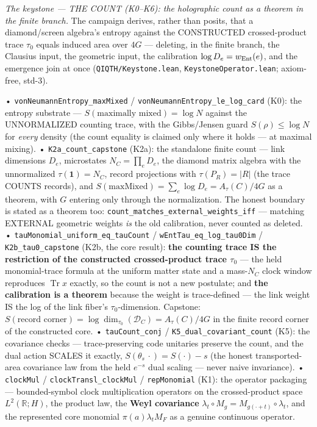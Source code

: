 \documentclass[11pt,a4paper]{article}
\begin{document}
\emph{The keystone — THE COUNT (K0--K6): the holographic count as a theorem in the finite branch.} The campaign derives, rather than posits, that a diamond/screen algebra's entropy against the CONSTRUCTED crossed-product trace $\tau_0$ equals induced area over $4G$ — deleting, in the finite branch, the Clausius input, the geometric input, the calibration $\log D_e = w_{\rm Ent}(e)$, and the emergence join at once (\texttt{QIQTH/Keystone.lean}, \texttt{KeystoneOperator.lean}; axiom-free, std-3).

  • \texttt{vonNeumannEntropy\_maxMixed} / \texttt{vonNeumannEntropy\_le\_log\_card} (K0): the entropy substrate — $S(\text{maximally mixed}) = \log N$ against the UNNORMALIZED counting trace, with the Gibbs/Jensen guard $S(\rho)\le\log N$ for \emph{every} density (the count equality is claimed only where it holds — at maximal mixing).
  • \texttt{K2a\_count\_capstone} (K2a): the standalone finite count — link dimensions $D_e$, microstates $N_C=\prod_e D_e$, the diamond matrix algebra with the unnormalized $\tau(\mathbf{1})=N_C$, record projections with $\tau(P_R)=|R|$ (the trace COUNTS records), and $S(\text{maxMixed}) = \sum_e \log D_e = A_\tau(C)/4G$ as a theorem, with $G$ entering only through the normalization. The honest boundary is stated as a theorem too: \texttt{count\_matches\_external\_weights\_iff} — matching EXTERNAL geometric weights \emph{is} the old calibration, never counted as deleted.
  • \texttt{tauMonomial\_uniform\_eq\_tauCount} / \texttt{wEntTau\_eq\_log\_tau0Dim} / \texttt{K2b\_tau0\_capstone} (K2b, the core result): \textbf{the counting trace IS the restriction of the constructed crossed-product trace $\tau_0$} — the held monomial-trace formula at the uniform matter state and a mass-$N_C$ clock window reproduces $\operatorname{Tr}x$ exactly, so the count is not a new postulate; and \textbf{the calibration is a theorem} because the weight is trace-defined — the link weight IS the log of the link fiber's $\tau_0$-dimension. Capstone: $S(\text{record corner}) = \log\dim_{\tau_0}(\mathcal{D}_C) = A_\tau(C)/4G$ in the finite record corner of the constructed core.
  • \texttt{tauCount\_conj} / \texttt{K5\_dual\_covariant\_count} (K5): the covariance checks — trace-preserving code unitaries preserve the count, and the dual action SCALES it exactly, $S(\theta_s\,\cdot) = S(\cdot) - s$ (the honest transported-area covariance law from the held $e^{-s}$ dual scaling — never naive invariance).
  • \texttt{clockMul} / \texttt{clockTransl\_clockMul} / \texttt{repMonomial} (K1): the operator packaging — bounded-symbol clock multiplication operators on the crossed-product space $L^2(\mathbb{R};H)$, the product law, the \textbf{Weyl covariance} $\lambda_t \circ M_g = M_{g(\cdot+t)}\circ\lambda_t$, and the represented core monomial $\pi(a)\lambda_t M_F$ as a genuine continuous operator.
\end{document}
